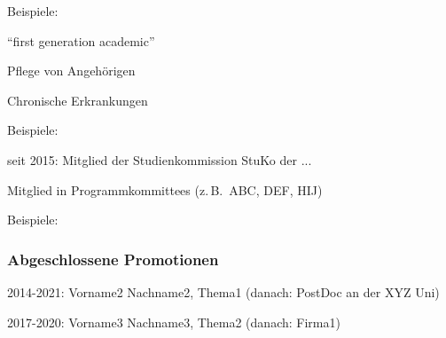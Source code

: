 \documentclass[checked=true,walterbenjamin=false]{dfg-cv-en}
\begin{document}
\secWerdegang \optionaltext %

\noindent Beispiele:
\begin{compactItemize}
    \item \enquote{first generation academic}
    \item Pflege von Angehörigen
    \item Chronische Erkrankungen
\end{compactItemize}


\secEngagement \optionaltext %

\noindent Beispiele:
\begin{compactItemize}
    \item seit 2015: Mitglied der Studienkommission StuKo der ...
    \item Mitglied in Programmkommittees (z.\,B.\ ABC, DEF, HIJ)
\end{compactItemize}


\secBetreuung \semioptionaltext %

\noindent Beispiele:
\subsubsection*{Abgeschlossene Promotionen}

\begin{compactItemize}
\item 2014-2021: Vorname2 Nachname2, Thema1 (danach: PostDoc an der XYZ Uni)
\item 2017-2020: Vorname3 Nachname3, Thema2 (danach: Firma1)
\end{compactItemize}
\end{document}
